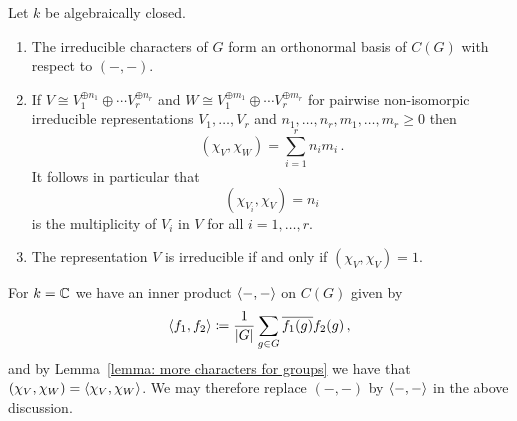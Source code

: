 \begin{theorem}
  Let $k$ be algebraically closed.
  \begin{enumerate}
    \item
      The irreducible characters of $G$ form an orthonormal basis of $C(G)$ with respect to $(-,-)$.
    \item
      If $V \cong V_1^{\oplus n_1} \oplus \dotsb V_r^{\oplus n_r}$ and $W \cong V_1^{\oplus m_1} \oplus \dotsb V_r^{\oplus m_r}$ for pairwise non-isomorpic irreducible representations $V_1, \dotsc, V_r$ and $n_1, \dotsc, n_r, m_1, \dotsc, m_r \geq 0$ then
      \[
          (\chi_V, \chi_W)
        = \sum_{i=1}^r n_i m_i \,.
      \]
      It follows in particular that
      \[
          (\chi_{V_i}, \chi_V)
        = n_i
      \]
      is the multiplicity of $V_i$ in $V$ for all $i = 1, \dotsc, r$.
    \item
      The representation $V$ is irreducible if and only if $(\chi_V, \chi_V) = 1$.
  \end{enumerate}
\end{theorem}


\begin{fluff}
  For $k = \mathbb{C}$ we have an inner product $\langle -,- \rangle$ on $C(G)$ given by
  \[
              \langle f_1, f_2 \rangle
    \coloneqq  \frac{1}{|G|} \sum_{g \in G} \overline{f_1(g)} f_2(g) \,,
  \]
   and by Lemma~\ref{lemma: more characters for groups} we have that $(\chi_V, \chi_W) = \langle \chi_V, \chi_W \rangle$.
   We may therefore replace $(-,-)$ by $\langle -,- \rangle$ in the above discussion.
\end{fluff}


